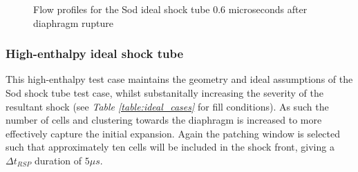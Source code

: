 \documentclass[a4paper,10pt]{article}
\begin{document}
\begin{figure}[tbh]
\begin{center}
{{      } \quad
      }
    \caption{Flow profiles for the Sod ideal shock tube 0.6 microseconds after diaphragm rupture}
    \label{fig:sod_profiles}
  \end{center}
\end{figure} 

\subsubsection{High-enthalpy ideal shock tube}

This high-enthalpy test case maintains the geometry and ideal assumptions of the Sod shock tube test case, whilst substanitally increasing the severity of the resultant shock (see \emph{Table \ref{table:ideal_cases}} for fill conditions).  As such the number of cells and clustering towards the diaphragm is increased to more effectively capture the initial expansion.  Again the patching window is selected such that approximately ten cells will be included in the shock front, giving a $\Delta t_{RSP}$ duration of $5 \mu s$.

\par \medskip
\end{document}

